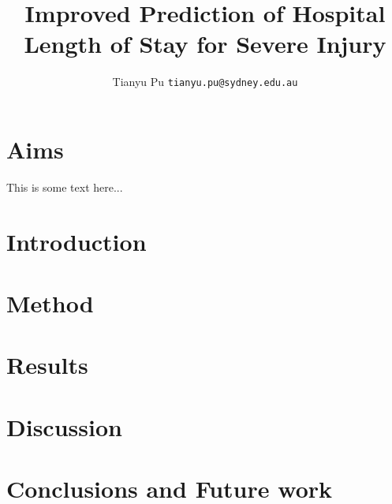 \documentclass[portrait]{usydposter}
\title{Improved Prediction of Hospital Length of Stay for Severe Injury}
\author{Tianyu Pu \texttt{tianyu.pu@sydney.edu.au}}
\begin{document}
\makeheader

\begin{multicols}{3}

\section{Aims}
\noindent This is some text here...
\cite{Dinh2013a}

\section{Introduction}

\section{Method}

\section{Results}

\section{Discussion}

\section{Conclusions and Future work}



\end{multicols}
\end{document}
